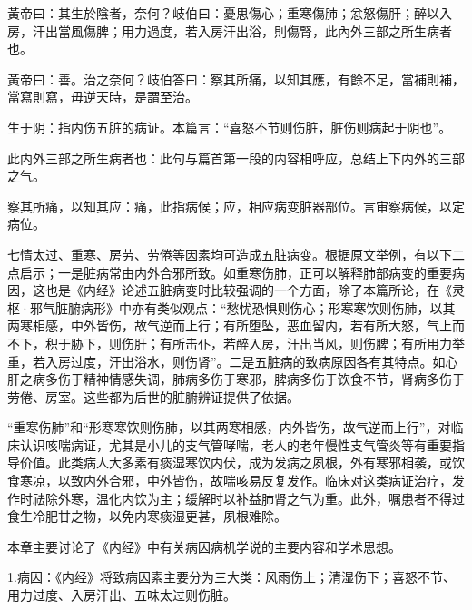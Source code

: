 \documentclass[draft,12pt]{ctexbook}
\begin{document}

\begin{yuanwen}
黃帝曰：其生於陰者，奈何？岐伯曰：憂思傷心；重寒傷肺；忿怒傷肝；醉以入房，汗出當風傷脾；用力過度，若入房汗出浴，則傷腎，此內外三部之所生病者也。

黃帝曰：善。治之奈何？岐伯答曰：察其所痛，以知其應，有餘不足，當補則補，當寫則寫，毋逆天時，是謂至治。
\end{yuanwen}


\begin{jiaozhu}
	\item 生于阴：指内伤五脏的病证。本篇言：“喜怒不节则伤脏，脏伤则病起于阴也”。
	\item 此内外三部之所生病者也：此句与篇首第一段的内容相呼应，总结上下内外的三部之气。
	\item 察其所痛，以知其应：痛，此指病候；应，相应病变脏器部位。言审察病候，以定病位。
\end{jiaozhu}



七情太过、重寒、房劳、劳倦等因素均可造成五脏病变。根据原文举例，有以下二点启示；一是脏病常由内外合邪所致。如重寒伤肺，正可以解释肺部病变的重要病因，这也是《内经》论述五脏病变时比较强调的一个方面，除了本篇所论，在《灵枢·邪气脏腑病形》中亦有类似观点：“愁忧恐惧则伤心；形寒寒饮则伤肺，以其两寒相感，中外皆伤，故气逆而上行；有所堕坠，恶血留内，若有所大怒，气上而不下，积于胁下，则伤肝；有所击仆，若醉入房，汗出当风，则伤脾；有所用力举重，若入房过度，汗出浴水，则伤肾”。二是五脏病的致病原因各有其特点。如心肝之病多伤于精神情感失调，肺病多伤于寒邪，脾病多伤于饮食不节，肾病多伤于劳倦、房室。这些都为后世的脏腑辨证提供了依据。


“重寒伤肺”和“形寒寒饮则伤肺，以其两寒相感，内外皆伤，故气逆而上行”，对临床认识咳喘病证，尤其是小儿的支气管哮喘，老人的老年慢性支气管炎等有重要指导价值。此类病人大多素有痰湿寒饮内伏，成为发病之夙根，外有寒邪相袭，或饮食寒凉，以致内外合邪，中外皆伤，故喘咳易反复发作。临床对这类病证治疗，发作时祛除外寒，温化内饮为主；缓解时以补益肺肾之气为重。此外，嘱患者不得过食生冷肥甘之物，以免内寒痰湿更甚，夙根难除。

\xiaojie

本章主要讨论了《内经》中有关病因病机学说的主要内容和学术思想。

1.病因：《内经》将致病因素主要分为三大类：风雨伤上；清湿伤下；喜怒不节、用力过度、入房汗出、五味太过则伤脏。
\end{document}
